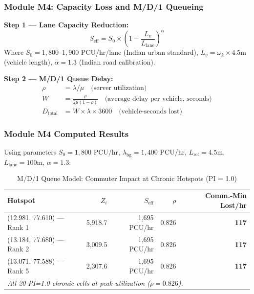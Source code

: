 \documentclass[12pt,a4paper]{article}
\begin{document}
\subsubsection{Module M4: Capacity Loss and M/D/1 Queueing}

\begin{tcolorbox}[formulabox]
\noindent\textbf{Step 1 — Lane Capacity Reduction:}
\begin{equation}
    S_\text{eff} = S_0 \times \left(1 - \frac{L_v}{L_\text{lane}}\right)^\alpha
\end{equation}
Where $S_0 = 1,800$--$1,900$ PCU/hr/lane (Indian urban standard), $L_v = \omega_k \times 4.5\text{m}$ (vehicle length), $\alpha = 1.3$ (Indian road calibration).

\noindent\textbf{Step 2 — M/D/1 Queue Delay:}
\begin{align}
    \rho &= \lambda / \mu \quad \text{(server utilization)} \\
    W &= \frac{\rho}{2\mu(1-\rho)} \quad \text{(average delay per vehicle, seconds)} \\
    D_\text{total} &= W \times \lambda \times 3600 \quad \text{(vehicle-seconds lost)}
\end{align}
\end{tcolorbox}

\subsubsection{Module M4 Computed Results}

Using parameters $S_0 = 1,800$ PCU/hr, $\lambda_\text{bg} = 1,400$ PCU/hr, $L_\text{ref} = 4.5\text{m}$, $L_\text{lane} = 100\text{m}$, $\alpha = 1.3$:

\begin{table}[H]
\centering
\caption{M/D/1 Queue Model: Commuter Impact at Chronic Hotspots (PI = 1.0)}
\begin{tabular}{lrrrr}
\toprule
\textbf{Hotspot} & \textbf{$Z_i$} & \textbf{$S_\text{eff}$} & \textbf{$\rho$} & \textbf{Comm.-Min Lost/hr} \\
\midrule
(12.981, 77.610) — Rank 1 & 5,918.7 & 1,695 PCU/hr & 0.826 & \textbf{117} \\
(13.184, 77.680) — Rank 2 & 3,009.5 & 1,695 PCU/hr & 0.826 & \textbf{117} \\
(13.071, 77.588) — Rank 5 & 2,307.6 & 1,695 PCU/hr & 0.826 & \textbf{117} \\
\bottomrule
\multicolumn{5}{l}{\textit{All 20 PI=1.0 chronic cells at peak utilization ($\rho = 0.826$).}} \\
\end{tabular}
\end{table}
\end{document}
